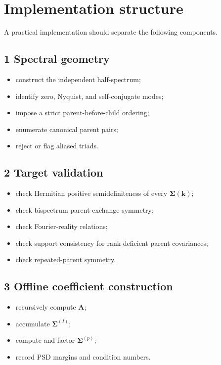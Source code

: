 \documentclass[
  11pt,
  a4paper,
]{article}
\providecommand{\tightlist}{%
  \setlength{\itemsep}{0pt}\setlength{\parskip}{0pt}}
\begin{document}
\section{Implementation structure}\label{implementation-structure}

A practical implementation should separate the following components.

\subsection{1 Spectral geometry}\label{spectral-geometry}

\begin{itemize}
\tightlist
\item
  construct the independent half-spectrum;
\item
  identify zero, Nyquist, and self-conjugate modes;
\item
  impose a strict parent-before-child ordering;
\item
  enumerate canonical parent pairs;
\item
  reject or flag aliased triads.
\end{itemize}

\subsection{2 Target validation}\label{target-validation}

\begin{itemize}
\tightlist
\item
  check Hermitian positive semidefiniteness of every
  \(\boldsymbol\Sigma(\boldsymbol k)\);
\item
  check bispectrum parent-exchange symmetry;
\item
  check Fourier-reality relations;
\item
  check support consistency for rank-deficient parent covariances;
\item
  check repeated-parent symmetry.
\end{itemize}

\subsection{3 Offline coefficient
construction}\label{offline-coefficient-construction}

\begin{itemize}
\tightlist
\item
  recursively compute \(\boldsymbol A\);
\item
  accumulate \(\boldsymbol\Sigma^{(I)}\);
\item
  compute and factor \(\boldsymbol\Sigma^{(p)}\);
\item
  record PSD margins and condition numbers.
\end{itemize}
\end{document}
